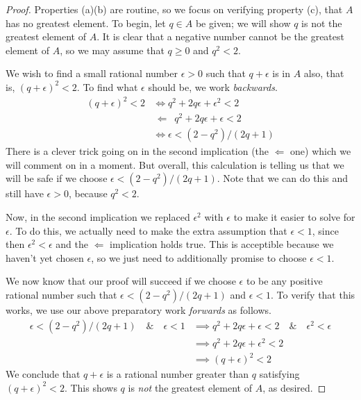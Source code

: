 \documentclass[11pt,oneside]{amsbook}
\theoremstyle{definition}
\theoremstyle{plain}
\theoremstyle{definition}
\theoremstyle{remark}
\numberwithin{equation}{section}
\numberwithin{figure}{section}
\begin{document}
\begin{proof}
  Properties (a)(b) are routine, so we focus on verifying property (c), that $A$ has no greatest element. To begin, let $q\in A$ be given; we will show $q$ is not the greatest element of $A$. It is clear that a negative number cannot be the greatest element of $A$, so we may assume that $q\geq0$ and $q^2<2$.
  
  We wish to find a small rational number $\epsilon>0$ such that $q+\epsilon$ is in $A$ also, that is, $(q+\epsilon)^2<2$. To find what $\epsilon$ should be, we work \emph{backwards}.
  \begin{align*}
    (q+\epsilon)^2<2&\iff q^2+2q\epsilon+\epsilon^2<2\\
    &\,\Longleftarrow\,\,\, q^2+2q\epsilon+\epsilon<2\\
    &\iff \epsilon<(2-q^2)/(2q+1)
  \end{align*}
  There is a clever trick going on in the second implication (the $\Longleftarrow$ one) which we will comment on in a moment. But overall, this calculation is telling us that we will be safe if we choose $\epsilon<(2-q^2)/(2q+1)$. Note that we can do this and still have $\epsilon>0$, because $q^2<2$.

  Now, in the second implication we replaced $\epsilon^2$ with $\epsilon$ to make it easier to solve for $\epsilon$. To do this, we actually need to make the extra assumption that $\epsilon<1$, since then $\epsilon^2<\epsilon$ and the $\Longleftarrow$ implication holds true. This is acceptible because we haven't yet chosen $\epsilon$, so we just need to additionally promise to choose $\epsilon<1$.

  We now know that our proof will succeed if we choose $\epsilon$ to be any positive rational number such that $\epsilon<(2-q^2)/(2q+1)$ and $\epsilon<1$. To verify that this works, we use our above preparatory work \emph{forwards} as follows.
  \begin{align*}
    \epsilon<(2-q^2)/(2q+1)\quad\&\quad\epsilon<1
    &\implies q^2+2q\epsilon+\epsilon<2\quad\&\quad\epsilon^2<\epsilon\\
    &\implies q^2+2q\epsilon+\epsilon^2<2\\
    &\implies (q+\epsilon)^2<2
  \end{align*}
  We conclude that $q+\epsilon$ is a rational number greater than $q$ satisfying $(q+\epsilon)^2<2$. This shows $q$ is \emph{not} the greatest element of $A$, as desired.
\end{proof}
\end{document}
